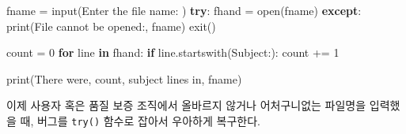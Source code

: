 \documentclass[
  letterpaper,
]{book}
\newenvironment{Shaded}{\begin{snugshade}}{\end{snugshade}}
\newcommand{\BuiltInTok}[1]{\textcolor[rgb]{0.00,0.23,0.31}{#1}}
\newcommand{\ControlFlowTok}[1]{\textcolor[rgb]{0.00,0.23,0.31}{\textbf{#1}}}
\newcommand{\DecValTok}[1]{\textcolor[rgb]{0.68,0.00,0.00}{#1}}
\newcommand{\FunctionTok}[1]{\textcolor[rgb]{0.28,0.35,0.67}{#1}}
\newcommand{\KeywordTok}[1]{\textcolor[rgb]{0.00,0.23,0.31}{\textbf{#1}}}
\newcommand{\NormalTok}[1]{\textcolor[rgb]{0.00,0.23,0.31}{#1}}
\newcommand{\OperatorTok}[1]{\textcolor[rgb]{0.37,0.37,0.37}{#1}}
\newcommand{\SpecialCharTok}[1]{\textcolor[rgb]{0.37,0.37,0.37}{#1}}
\newcommand{\StringTok}[1]{\textcolor[rgb]{0.13,0.47,0.30}{#1}}
\begin{document}
\begin{Shaded}
\begin{Highlighting}[]
\NormalTok{fname }\OperatorTok{=} \BuiltInTok{input}\NormalTok{(}\StringTok{\textquotesingle{}Enter the file name: \textquotesingle{}}\NormalTok{)}
\ControlFlowTok{try}\NormalTok{:}
\NormalTok{    fhand }\OperatorTok{=} \BuiltInTok{open}\NormalTok{(fname)}
\ControlFlowTok{except}\NormalTok{:}
    \BuiltInTok{print}\NormalTok{(}\StringTok{\textquotesingle{}File cannot be opened:\textquotesingle{}}\NormalTok{, fname)}
\NormalTok{    exit()}

\NormalTok{count }\OperatorTok{=} \DecValTok{0}
\ControlFlowTok{for}\NormalTok{ line }\KeywordTok{in}\NormalTok{ fhand:}
    \ControlFlowTok{if}\NormalTok{ line.startswith(}\StringTok{\textquotesingle{}Subject:\textquotesingle{}}\NormalTok{):}
\NormalTok{        count }\OperatorTok{+=} \DecValTok{1}

\BuiltInTok{print}\NormalTok{(}\StringTok{\textquotesingle{}There were\textquotesingle{}}\NormalTok{, count, }\StringTok{\textquotesingle{}subject lines in\textquotesingle{}}\NormalTok{, fname)}
\end{Highlighting}
\end{Shaded}

이제 사용자 혹은 품질 보증 조직에서 올바르지 않거나 어처구니없는
파일명을 입력했을 때, 버그를 \texttt{try()} 함수로 잡아서 우아하게
복구한다.

\begin{Shaded}
\end{Shaded}
\end{document}
